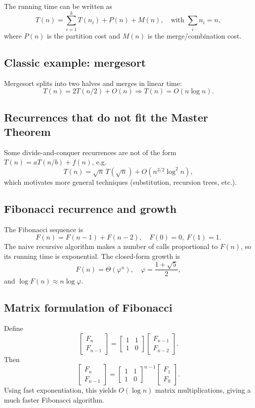 \documentclass[11pt]{article}
\begin{document}
{{The running time can be written as
\[
T(n) = \sum_{i=1}^k T(n_i) + P(n) + M(n),
\quad \text{with } \sum_i n_i = n,
\]
where $P(n)$ is the partition cost and $M(n)$ is the merge/combination cost.

\subsection*{Classic example: mergesort}
Mergesort splits into two halves and merges in linear time:
\[
T(n) = 2T(n/2) + O(n) \Rightarrow T(n) = O(n \log n).
\]

\subsection*{Recurrences that do not fit the Master Theorem}
Some divide-and-conquer recurrences are not of the form $T(n)=aT(n/b)+f(n)$, e.g.
\[
T(n) = \sqrt{n}\,T(\sqrt{n}) + O(n^{3/2}\log^2 n),
\]
which motivates more general techniques (substitution, recursion trees, etc.).

\subsection*{Fibonacci recurrence and growth}
The Fibonacci sequence is
\[
F(n) = F(n-1) + F(n-2), \quad F(0)=0,\ F(1)=1.
\]
The naive recursive algorithm makes a number of calls proportional to $F(n)$, so its running time
is exponential. The closed-form growth is
\[
F(n) = \Theta(\varphi^n), \quad \varphi = \frac{1+\sqrt{5}}{2},
\]
and $\log F(n) \approx n \log \varphi$.

\subsection*{Matrix formulation of Fibonacci}
Define
\[
\begin{bmatrix}F_n \\ F_{n-1}\end{bmatrix}
=
\begin{bmatrix}1 & 1 \\ 1 & 0\end{bmatrix}
\begin{bmatrix}F_{n-1} \\ F_{n-2}\end{bmatrix}.
\]
Then
\[
\begin{bmatrix}F_n \\ F_{n-1}\end{bmatrix}
=
\begin{bmatrix}1 & 1 \\ 1 & 0\end{bmatrix}^{n-1}
\begin{bmatrix}F_1 \\ F_0\end{bmatrix}.
\]
Using fast exponentiation, this yields $O(\log n)$ matrix multiplications, giving a much faster
Fibonacci algorithm.

}}
\end{document}
